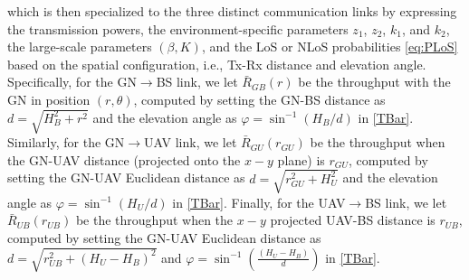 \documentclass[10pt,twocolumn]{IEEEtran}
\begin{document}
which is then specialized to the three distinct communication links by expressing the transmission powers, the environment-specific parameters $z_{1}$, $z_{2}$, $k_{1}$, and $k_{2}$, the large-scale parameters $(\beta,K)$, and the LoS or NLoS probabilities \eqref{eq:PLoS} based on the spatial configuration, i.e., Tx-Rx distance and elevation angle. Specifically, for the GN$\rightarrow$BS link, we let $\bar{R}_{GB}(r)$ be the throughput with the GN in position $(r,\theta)$, computed by setting the GN-BS distance as $d{=}\sqrt{H_{B}^{2}{+}r^{2}}$ and the elevation angle as $\varphi{=}\sin^{-1}\left(H_{B}/d\right)$ in \eqref{TBar}. Similarly, for the GN$\rightarrow$UAV link, we let $\bar{R}_{GU}(r_{GU})$ be the throughput when the GN-UAV distance (projected onto the $x{-}y$ plane) is $r_{GU}$, computed by setting the GN-UAV Euclidean distance as $d{=}\sqrt{r_{GU}^{2}{+}H_{U}^{2}}$ and the elevation angle as $\varphi{=}\sin^{-1}\left(H_{U}/d\right)$ in \eqref{TBar}. Finally, for the UAV$\rightarrow$BS link, we let $\bar{R}_{UB}(r_{UB})$ be the throughput when the $x{-}y$ projected UAV-BS distance is $r_{UB}$, computed by setting the GN-UAV Euclidean distance as $d{=}\sqrt{r_{UB}^{2}{+}(H_{U}{-}H_{B})^{2}}$ and $\varphi{=}\sin^{-1}\left(\frac{(H_{U}{-}H_{B})}{d}\right)$ in \eqref{TBar}.\\

\vspace{-6mm}
\end{document}
